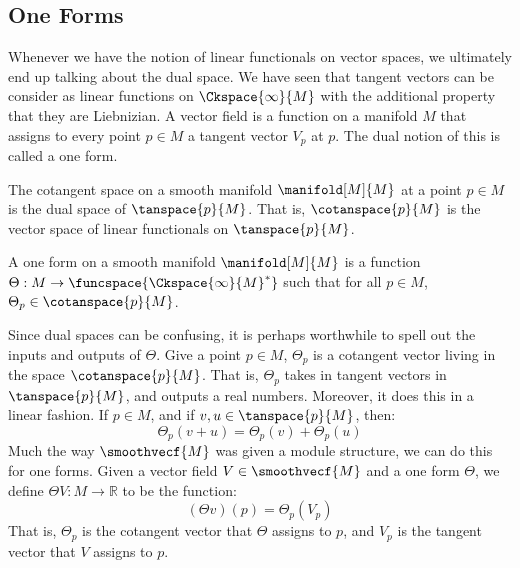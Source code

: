     \subsection{One Forms}
        Whenever we have the notion of linear functionals on vector spaces,
        we ultimately end up talking about the dual space. We have seen that
        tangent vectors can be consider as linear functions on
        $\Ckspace{\infty}{M}$ with the additional property that they are
        Liebnizian. A vector field is a function on a manifold $M$ that
        assigns to every point $p\in{M}$ a tangent vector $V_{p}$ at $p$.
        The dual notion of this is called a one form.
        \begin{definition}
            The cotangent space on a smooth manifold $\manifold[M]{M}$ at a
            point $p\in{M}$ is the dual space of $\tanspace{p}{M}$. That
            is, $\cotanspace{p}{M}$ is the vector space of linear
            functionals on $\tanspace{p}{M}$.
        \end{definition}
        \begin{definition}
            A one form on a smooth manifold $\manifold[M]{M}$ is a function
            $\Theta:M\rightarrow\funcspace{\Ckspace{\infty}{M}^{*}}$ such
            that for all $p\in{M}$, $\Theta_{p}\in\cotanspace{p}{M}$.
        \end{definition}
        Since dual spaces can be confusing, it is perhaps worthwhile to
        spell out the inputs and outputs of $\Theta$. Give a point
        $p\in{M}$, $\Theta_{p}$ is a cotangent vector living in the space
        $\cotanspace{p}{M}$. That is, $\Theta_{p}$ takes in tangent vectors
        in $\tanspace{p}{M}$, and outputs a real numbers. Moreover, it does
        this in a linear fashion. If $p\in{M}$, and if
        $v,u\in\tanspace{p}{M}$, then:
        \begin{equation}
            \Theta_{p}(v+u)=\Theta_{p}(v)+\Theta_{p}(u)
        \end{equation}
        Much the way $\smoothvecf{M}$ was given a module structure, we can
        do this for one forms. Given a vector field $V\in\smoothvecf{M}$ and
        a one form $\Theta$, we define $\Theta{V}:M\rightarrow\mathbb{R}$
        to be the function:
        \begin{equation}
            (\Theta{v})(p)=\Theta_{p}(V_{p})
        \end{equation}
        That is, $\Theta_{p}$ is the cotangent vector that $\Theta$ assigns
        to $p$, and $V_{p}$ is the tangent vector that $V$ assigns to $p$.
